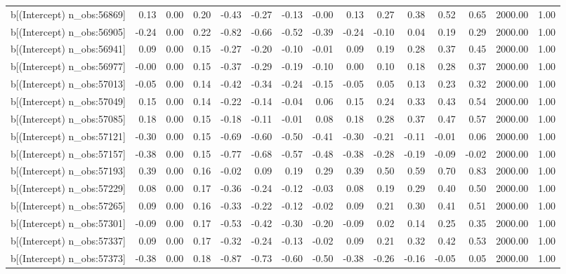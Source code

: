 \begin{table}[ht]
\begin{tabular}{rrrrrrrrrrrrrrr}
  b[(Intercept) n\_obs:56869] & 0.13 & 0.00 & 0.20 & -0.43 & -0.27 & -0.13 & -0.00 & 0.13 & 0.27 & 0.38 & 0.52 & 0.65 & 2000.00 & 1.00 \\ 
  b[(Intercept) n\_obs:56905] & -0.24 & 0.00 & 0.22 & -0.82 & -0.66 & -0.52 & -0.39 & -0.24 & -0.10 & 0.04 & 0.19 & 0.29 & 2000.00 & 1.00 \\ 
  b[(Intercept) n\_obs:56941] & 0.09 & 0.00 & 0.15 & -0.27 & -0.20 & -0.10 & -0.01 & 0.09 & 0.19 & 0.28 & 0.37 & 0.45 & 2000.00 & 1.00 \\ 
  b[(Intercept) n\_obs:56977] & -0.00 & 0.00 & 0.15 & -0.37 & -0.29 & -0.19 & -0.10 & 0.00 & 0.10 & 0.18 & 0.28 & 0.37 & 2000.00 & 1.00 \\ 
  b[(Intercept) n\_obs:57013] & -0.05 & 0.00 & 0.14 & -0.42 & -0.34 & -0.24 & -0.15 & -0.05 & 0.05 & 0.13 & 0.23 & 0.32 & 2000.00 & 1.00 \\ 
  b[(Intercept) n\_obs:57049] & 0.15 & 0.00 & 0.14 & -0.22 & -0.14 & -0.04 & 0.06 & 0.15 & 0.24 & 0.33 & 0.43 & 0.54 & 2000.00 & 1.00 \\ 
  b[(Intercept) n\_obs:57085] & 0.18 & 0.00 & 0.15 & -0.18 & -0.11 & -0.01 & 0.08 & 0.18 & 0.28 & 0.37 & 0.47 & 0.57 & 2000.00 & 1.00 \\ 
  b[(Intercept) n\_obs:57121] & -0.30 & 0.00 & 0.15 & -0.69 & -0.60 & -0.50 & -0.41 & -0.30 & -0.21 & -0.11 & -0.01 & 0.06 & 2000.00 & 1.00 \\ 
  b[(Intercept) n\_obs:57157] & -0.38 & 0.00 & 0.15 & -0.77 & -0.68 & -0.57 & -0.48 & -0.38 & -0.28 & -0.19 & -0.09 & -0.02 & 2000.00 & 1.00 \\ 
  b[(Intercept) n\_obs:57193] & 0.39 & 0.00 & 0.16 & -0.02 & 0.09 & 0.19 & 0.29 & 0.39 & 0.50 & 0.59 & 0.70 & 0.83 & 2000.00 & 1.00 \\ 
  b[(Intercept) n\_obs:57229] & 0.08 & 0.00 & 0.17 & -0.36 & -0.24 & -0.12 & -0.03 & 0.08 & 0.19 & 0.29 & 0.40 & 0.50 & 2000.00 & 1.00 \\ 
  b[(Intercept) n\_obs:57265] & 0.09 & 0.00 & 0.16 & -0.33 & -0.22 & -0.12 & -0.02 & 0.09 & 0.21 & 0.30 & 0.41 & 0.51 & 2000.00 & 1.00 \\ 
  b[(Intercept) n\_obs:57301] & -0.09 & 0.00 & 0.17 & -0.53 & -0.42 & -0.30 & -0.20 & -0.09 & 0.02 & 0.14 & 0.25 & 0.35 & 2000.00 & 1.00 \\ 
  b[(Intercept) n\_obs:57337] & 0.09 & 0.00 & 0.17 & -0.32 & -0.24 & -0.13 & -0.02 & 0.09 & 0.21 & 0.32 & 0.42 & 0.53 & 2000.00 & 1.00 \\ 
  b[(Intercept) n\_obs:57373] & -0.38 & 0.00 & 0.18 & -0.87 & -0.73 & -0.60 & -0.50 & -0.38 & -0.26 & -0.16 & -0.05 & 0.05 & 2000.00 & 1.00 \\ 

\end{tabular}
\end{table}
